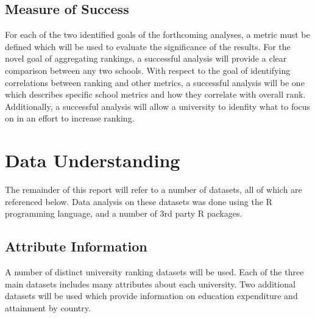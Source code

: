 \documentclass[12pt]{article}
\begin{document}
\subsection{Measure of Success}
For each of the two identified goals of the forthcoming analyses, a metric must be defined which will be used to evaluate the significance of the results. For the novel goal of aggregating rankings, a successful analysis will provide a clear comparison between any two schools. With respect to the goal of identifying correlations between ranking and other metrics, a successful analysis will be one which describes specific school metrics and how they correlate with overall rank. Additionally, a successful analysis will allow a university to idenfity what to focus on in an effort to increase ranking.

\section{Data Understanding}

The remainder of this report will refer to a number of datasets, all of which are referenced below. Data analysis on these datasets was done using the R programming language, and a number of 3rd party R packages.

\subsection{Attribute Information}
A number of distinct university ranking datasets will be used. Each of the three main datasets includes many attributes about each university.
Two additional datasets will be used which provide information on education expenditure and attainment by country.
\end{document}
